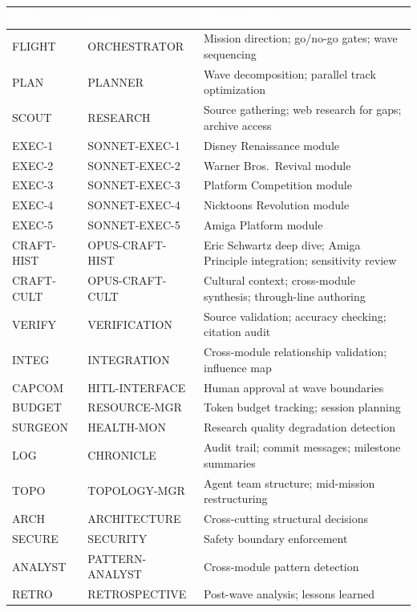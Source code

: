 \documentclass[11pt,letterpaper]{article}
\newcommand{\tableheader}[1]{\textbf{\sffamily\textcolor{white}{#1}}}
\begin{document}
\begin{center}
\begin{tabularx}{\textwidth}{L{2cm}L{3cm}X}
\toprule
{}
\tableheader{Role} & \tableheader{Agent} & \tableheader{Responsibility} \\
\midrule
FLIGHT & ORCHESTRATOR & Mission direction; go/no-go gates; wave sequencing \\
PLAN & PLANNER & Wave decomposition; parallel track optimization \\
SCOUT & RESEARCH & Source gathering; web research for gaps; archive access \\
EXEC-1 & SONNET-EXEC-1 & Disney Renaissance module \\
EXEC-2 & SONNET-EXEC-2 & Warner Bros.\ Revival module \\
EXEC-3 & SONNET-EXEC-3 & Platform Competition module \\
EXEC-4 & SONNET-EXEC-4 & Nicktoons Revolution module \\
EXEC-5 & SONNET-EXEC-5 & Amiga Platform module \\
CRAFT-HIST & OPUS-CRAFT-HIST & Eric Schwartz deep dive; Amiga Principle integration; sensitivity review \\
CRAFT-CULT & OPUS-CRAFT-CULT & Cultural context; cross-module synthesis; through-line authoring \\
VERIFY & VERIFICATION & Source validation; accuracy checking; citation audit \\
INTEG & INTEGRATION & Cross-module relationship validation; influence map \\
CAPCOM & HITL-INTERFACE & Human approval at wave boundaries \\
BUDGET & RESOURCE-MGR & Token budget tracking; session planning \\
SURGEON & HEALTH-MON & Research quality degradation detection \\
LOG & CHRONICLE & Audit trail; commit messages; milestone summaries \\
TOPO & TOPOLOGY-MGR & Agent team structure; mid-mission restructuring \\
ARCH & ARCHITECTURE & Cross-cutting structural decisions \\
SECURE & SECURITY & Safety boundary enforcement \\
ANALYST & PATTERN-ANALYST & Cross-module pattern detection \\
RETRO & RETROSPECTIVE & Post-wave analysis; lessons learned \\
\bottomrule
\end{tabularx}
\end{center}
\end{document}

